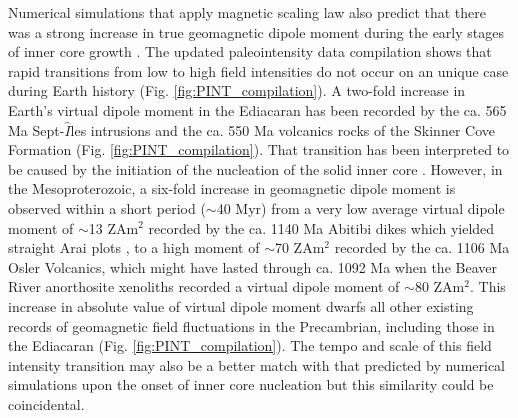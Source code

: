 \documentclass[9pt,twocolumn,twoside,lineno]{pnas-new}
\begin{document}
Numerical simulations that apply magnetic scaling law also predict that there was a strong increase in true geomagnetic dipole moment during the early stages of inner core growth \cite{Davies2021a}. The updated paleointensity data compilation shows that rapid transitions from low to high field intensities do not occur on an unique case during Earth history (Fig. \ref{fig:PINT_compilation}). A two-fold increase in Earth's virtual dipole moment in the Ediacaran has been recorded by the ca. 565 Ma Sept-$\hat{I}$les intrusions \cite{Bono2019a} and the ca. 550 Ma volcanics rocks of the Skinner Cove Formation \cite{Thallner2021a} (Fig. \ref{fig:PINT_compilation}). That transition has been interpreted to be caused by the initiation of the nucleation of the solid inner core \cite{Thallner2021a} . However, in the Mesoproterozoic, a six-fold increase in geomagnetic dipole moment is observed within a short period ($\sim$40 Myr) from a very low average virtual dipole moment of $\sim$13 ZAm$^2$ recorded by the ca. 1140 Ma Abitibi dikes which yielded straight Arai plots \cite{Macouin2003a}, to a high moment of $\sim$70 ZAm$^2$ recorded by the ca. 1106 Ma Osler Volcanics, which might have lasted through ca. 1092 Ma when the Beaver River anorthosite xenoliths recorded a virtual dipole moment of $\sim$80 ZAm$^2$. This increase in absolute value of virtual dipole moment dwarfs all other existing records of geomagnetic field fluctuations in the Precambrian, including those in the Ediacaran (Fig. \ref{fig:PINT_compilation}). The tempo and scale of this field intensity transition may also be a better match with that predicted by numerical simulations upon the onset of inner core nucleation \cite{Davies2021a} but this similarity could be coincidental.
\end{document}
